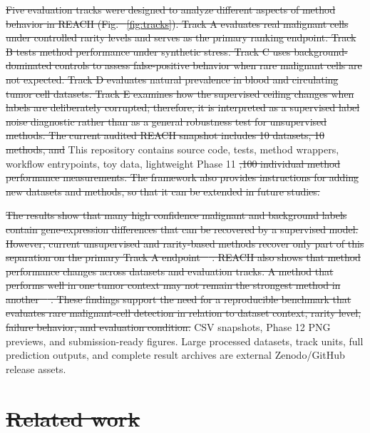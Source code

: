 \documentclass[10pt]{article}
\providecommand{\DIFaddtex}[1]{{\protect\color{trackgreen}#1}} %
\providecommand{\DIFdeltex}[1]{{\protect\color{red}\sout{#1}}}                      %
\providecommand{\DIFaddbegin}{} %
\providecommand{\DIFaddend}{} %
\providecommand{\DIFdelbegin}{} %
\providecommand{\DIFdelend}{} %
\providecommand{\DIFadd}[1]{\texorpdfstring{\DIFaddtex{#1}}{#1}} %
\providecommand{\DIFdel}[1]{\texorpdfstring{\DIFdeltex{#1}}{}} %
\newcommand{\DIFscaledelfig}{0.5}
\newlength{\DIFdelgraphicswidth} %
\newlength{\DIFdelgraphicsheight} %
\newcommand{\DIFaddincludegraphics}[2][]{{\color{trackgreen}\fbox{\DIFOincludegraphics[#1]{#2}}}} %
\newcommand{\DIFdelincludegraphics}[2][]{%
\sbox{\DIFdelgraphicsbox}{\DIFOincludegraphics[#1]{#2}}%
\settoboxwidth{\DIFdelgraphicswidth}{\DIFdelgraphicsbox} %
\settoboxtotalheight{\DIFdelgraphicsheight}{\DIFdelgraphicsbox} %
\scalebox{\DIFscaledelfig}{%
\parbox[b]{\DIFdelgraphicswidth}{\usebox{\DIFdelgraphicsbox}\\[-\baselineskip] \rule{\DIFdelgraphicswidth}{0em}}\llap{\resizebox{\DIFdelgraphicswidth}{\DIFdelgraphicsheight}{%
\setlength{\unitlength}{\DIFdelgraphicswidth}%
\begin{picture}(1,1)%
\thicklines\linethickness{2pt} %
{\color[rgb]{1,0,0}\put(0,0){\framebox(1,1){}}}%
{\color[rgb]{1,0,0}\put(0,0){\line( 1,1){1}}}%
{\color[rgb]{1,0,0}\put(0,1){\line(1,-1){1}}}%
\end{picture}%
}\hspace*{3pt}}} %
} %
\DeclareRobustCommand{\DIFaddbegin}{\DIFOaddbegin \let\includegraphics\DIFaddincludegraphics} %
\DeclareRobustCommand{\DIFaddend}{\DIFOaddend \let\includegraphics\DIFOincludegraphics} %
\DeclareRobustCommand{\DIFdelbegin}{\DIFOdelbegin \let\includegraphics\DIFdelincludegraphics} %
\DeclareRobustCommand{\DIFdelend}{\DIFOaddend \let\includegraphics\DIFOincludegraphics} %
\begin{document}
\DIFdelbegin \DIFdel{Five evaluation tracks were designed to analyze different aspects of method behavior in REACH (Fig. ~\ref{fig:tracks}). Track A evaluates real malignant cells under controlled rarity levels and serves as the primary ranking endpoint. Track B tests method performance under synthetic stress. Track C uses background-dominated controls to assess false-positive behavior when rare malignant cells are not expected. Track D evaluates natural prevalence in blood and circulating tumor cell datasets. Track E examines how the supervised ceiling changes when labels are deliberately corrupted; therefore, it is interpreted as a supervised label noise diagnostic rather than as a general robustness test for unsupervised methods. The current audited REACH snapshot includes 10 datasets, 10 methods, and }\DIFdelend \DIFaddbegin \DIFadd{This repository contains source code, tests, method wrappers, workflow
entrypoints, toy data, lightweight Phase }\DIFaddend 11 \DIFdelbegin \DIFdel{,100 individual method performance measurements. The framework also provides instructions for adding new datasets and methods, so that it can be extended in future studies.
}%

\DIFdel{The results show that many high confidence malignant and
  background labels contain gene-expression differences that can be recovered by a supervised model. However, current unsupervised and rarity-based methods recover only part of this separation on the primary Track A endpoint \mbox{%
\cite{abdelaal2019comparison,mahalanabis2022evaluation}}\hskip0pt%
. REACH also shows that method performance changes across datasets and evaluation tracks. A method that performs well in one tumor context may not remain the strongest method in another \mbox{%
\cite{xu2024sccad,ye2025revealing}}\hskip0pt%
. These findings support the need for a reproducible benchmark that evaluates rare malignant-cell detection in relation to dataset context, rarity level, failure behavior, and evaluation condition.
}\DIFdelend \DIFaddbegin \DIFadd{CSV snapshots, Phase 12 PNG
previews, and submission-ready figures. Large processed datasets, track
units, full prediction outputs, and complete result archives are
external Zenodo/GitHub release assets.
}\DIFaddend 

\DIFdelbegin \section{\DIFdel{Related work}}
\addtocounter{section}{-1}%
\DIFdelend \DIFaddbegin \begin{center}\DIFadd{\rule{0.5\linewidth}{0.5pt}}\end{center}
\DIFaddend 
\end{document}
